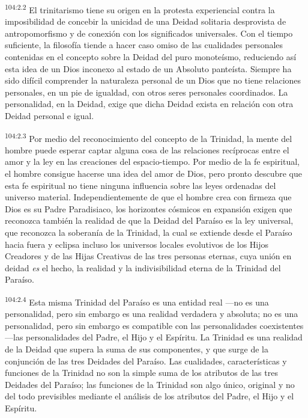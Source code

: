 \par
\textsuperscript{104:2.2} El trinitarismo tiene su origen en la protesta experiencial contra la imposibilidad de concebir la unicidad de una Deidad solitaria desprovista de antropomorfismo y de conexión con los significados universales. Con el tiempo suficiente, la filosofía tiende a hacer caso omiso de las cualidades personales contenidas en el concepto sobre la Deidad del puro monoteísmo, reduciendo así esta idea de un Dios inconexo al estado de un Absoluto panteísta. Siempre ha sido difícil comprender la naturaleza personal de un Dios que no tiene relaciones personales, en un pie de igualdad, con otros seres personales coordinados. La personalidad, en la Deidad, exige que dicha Deidad exista en relación con otra Deidad personal e igual.

\par
\textsuperscript{104:2.3} Por medio del reconocimiento del concepto de la Trinidad, la mente del hombre puede esperar captar alguna cosa de las relaciones recíprocas entre el amor y la ley en las creaciones del espacio-tiempo. Por medio de la fe espiritual, el hombre consigue hacerse una idea del amor de Dios, pero pronto descubre que esta fe espiritual no tiene ninguna influencia sobre las leyes ordenadas del universo material. Independientemente de que el hombre crea con firmeza que Dios es su Padre Paradisiaco, los horizontes cósmicos en expansión exigen que reconozca también la realidad de que la Deidad del Paraíso es la ley universal, que reconozca la soberanía de la Trinidad, la cual se extiende desde el Paraíso hacia fuera y eclipsa incluso los universos locales evolutivos de los Hijos Creadores y de las Hijas Creativas de las tres personas eternas, cuya unión en deidad \textit{es} el hecho, la realidad y la indivisibilidad eterna de la Trinidad del Paraíso.

\par
\textsuperscript{104:2.4} Esta misma Trinidad del Paraíso es una entidad real ---no es una personalidad, pero sin embargo es una realidad verdadera y absoluta; no es una personalidad, pero sin embargo es compatible con las personalidades coexistentes ---las personalidades del Padre, el Hijo y el Espíritu. La Trinidad es una realidad de la Deidad que supera la suma de sus componentes, y que surge de la conjunción de las tres Deidades del Paraíso. Las cualidades, características y funciones de la Trinidad no son la simple suma de los atributos de las tres Deidades del Paraíso; las funciones de la Trinidad son algo único, original y no del todo previsibles mediante el análisis de los atributos del Padre, el Hijo y el Espíritu.


